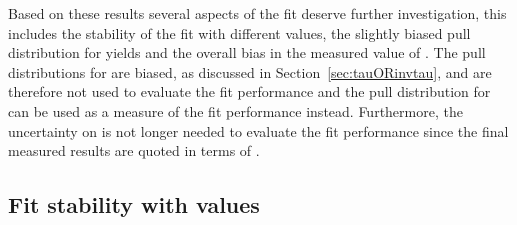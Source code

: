 Based on these results several aspects of the fit deserve further investigation, this includes the stability of the fit with different \tmumu values, the slightly biased pull distribution for \bsmumu yields and the overall bias in the measured value of \tmumu. The pull distributions for \tmumu are biased, as discussed in Section~\ref{sec:tauORinvtau}, and are therefore not used to evaluate the fit performance and the pull distribution for \Gmumu can be used as a measure of the fit performance instead. Furthermore, the uncertainty on \Gmumu is not longer needed to evaluate the fit performance since the final measured results are quoted in terms of \tmumu. %

\subsection{Fit stability with \tmumu values}

